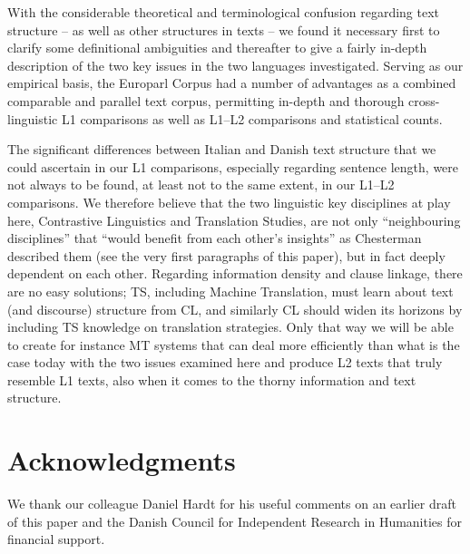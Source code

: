 \documentclass[output=paper]{LSP/langsci}
\begin{document}
With the considerable theoretical and terminological confusion regarding text structure -- as well as other structures in texts -- we found it necessary first to clarify some definitional ambiguities and thereafter to give a fairly in-depth description of the two key issues in the two languages investigated. Serving as our empirical basis, the Europarl Corpus had a number of advantages as a combined comparable and parallel text corpus, permitting in-depth and thorough cross-linguistic L1 comparisons as well as L1--L2 comparisons and statistical counts. 

The significant differences between Italian and Danish text structure that we could ascertain in our L1 comparisons, especially regarding sentence length, were not always to be found, at least not to the same extent, in our L1--L2 comparisons. We therefore believe that the two linguistic key disciplines at play here, Contrastive Linguistics and Translation Studies, are not only ``neighbouring disciplines'' that ``would benefit from each other's insights'' as Chesterman described them (see the very first paragraphs of this paper), but in fact deeply dependent on each other. Regarding information density and clause linkage, there are no easy solutions; TS, including Machine Translation, must learn about text (and discourse) structure from CL, and similarly CL should widen its horizons by including TS knowledge on translation strategies. Only that way we will be able to create for instance MT systems that can deal more efficiently than what is the case today with the two issues examined here and produce L2 texts that truly resemble L1 texts, also when it comes to the thorny information and text structure.

\section{Acknowledgments}\label{sec:korzen:6}

We thank our colleague Daniel Hardt for his useful comments on an earlier draft of this paper and the Danish Council for Independent Research in Humanities for financial support.

\sloppy
\printbibliography[heading=subbibliography,notkeyword=this]
\end{document}
